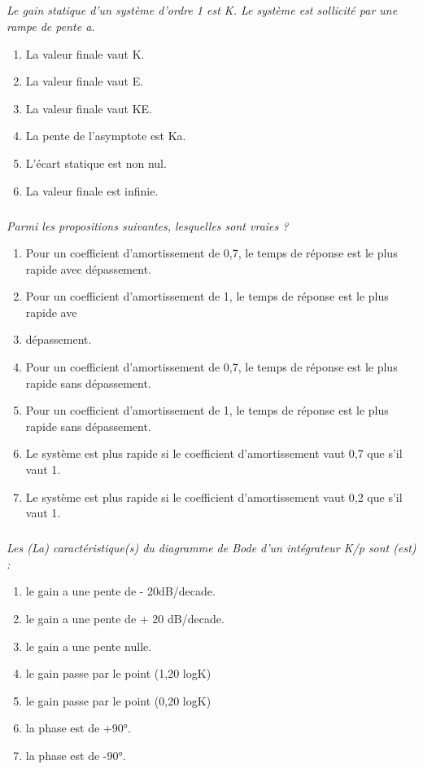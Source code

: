 \documentclass[10pt,fleqn]{article} %
\begin{document}
\begin{multicols}{2}
\subparagraph{}\textit{ Le gain statique d'un système d'ordre 1 est K. Le système est sollicité par une rampe de pente a.}
\begin{enumerate}
\item La valeur finale vaut K.
\item La valeur finale vaut E.
\item La valeur finale vaut KE.
\item La pente de l'asymptote est Ka.
\item L'écart statique est non nul.
\item La valeur finale est infinie.
\end{enumerate}


\subparagraph{}\textit{Parmi les propositions suivantes, lesquelles sont vraies ?}
\begin{enumerate}
\item Pour un coefficient d'amortissement de 0,7, le temps de réponse est le plus rapide avec
dépassement.
\item Pour un coefficient d'amortissement de 1, le temps de réponse est le plus rapide ave\item dépassement.
\item Pour un coefficient d'amortissement de 0,7, le temps de réponse est le plus rapide sans
dépassement.
\item Pour un coefficient d'amortissement de 1, le temps de réponse est le plus rapide sans dépassement.
\item Le système est plus rapide si le coefficient d'amortissement vaut 0,7 que s'il vaut 1.
\item Le système est plus rapide si le coefficient d'amortissement vaut 0,2 que s'il vaut 1.
\end{enumerate}

\subparagraph{}\textit{Les (La) caractéristique(s) du diagramme de Bode d'un intégrateur K/p sont (est) :}
\begin{enumerate}
\item le gain a une pente de - 20dB/decade.
\item le gain a une pente de + 20 dB/decade.
\item le gain a une pente nulle.
\item le gain passe par le point (1,20 logK)
\item le gain passe par le point (0,20 logK)
\item la phase est de +90°.
\item la phase est de -90°.
\end{enumerate}


\end{multicols}
\end{document}
